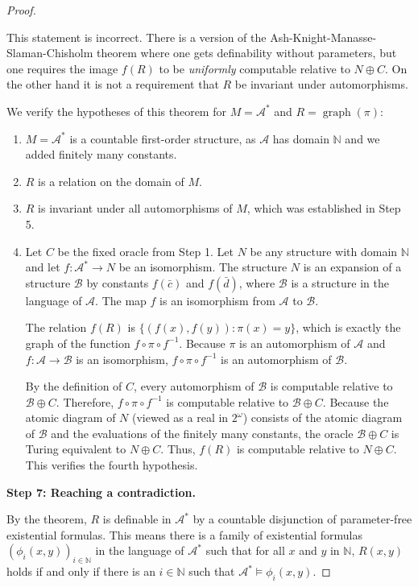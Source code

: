 \documentclass[12pt]{article}
\newcommand{\review}[1]{\begin{reviewbox}#1\end{reviewbox}}
\begin{document}
\begin{proof}
\review{This statement is incorrect. There is a version of the Ash-Knight-Manasse-Slaman-Chisholm theorem where one gets definability without parameters, but one requires the image $f(R)$ to be \textit{uniformly} computable relative to $N \oplus C$. On the other hand it is not a requirement that $R$ be invariant under automorphisms.}

We verify the hypotheses of this theorem for $M = \mathcal{A}^*$ and $R = \operatorname{graph}(\pi)$:
\begin{enumerate}
\item $M = \mathcal{A}^*$ is a countable first-order structure, as $\mathcal{A}$ has domain $\mathbb{N}$ and we added finitely many constants.
\item $R$ is a relation on the domain of $M$.
\item $R$ is invariant under all automorphisms of $M$, which was established in Step 5.
\item Let $C$ be the fixed oracle from Step 1. Let $N$ be any structure with domain $\mathbb{N}$ and let $f: \mathcal{A}^* \to N$ be an isomorphism. The structure $N$ is an expansion of a structure $\mathcal{B}$ by constants $f(\bar{c})$ and $f(\bar{d})$, where $\mathcal{B}$ is a structure in the language of $\mathcal{A}$. The map $f$ is an isomorphism from $\mathcal{A}$ to $\mathcal{B}$. 

The relation $f(R)$ is $\{ (f(x), f(y)) : \pi(x) = y \}$, which is exactly the graph of the function $f \circ \pi \circ f^{-1}$. Because $\pi$ is an automorphism of $\mathcal{A}$ and $f: \mathcal{A} \to \mathcal{B}$ is an isomorphism, $f \circ \pi \circ f^{-1}$ is an automorphism of $\mathcal{B}$. 

By the definition of $C$, every automorphism of $\mathcal{B}$ is computable relative to $\mathcal{B} \oplus C$. Therefore, $f \circ \pi \circ f^{-1}$ is computable relative to $\mathcal{B} \oplus C$. Because the atomic diagram of $N$ (viewed as a real in $2^\omega$) consists of the atomic diagram of $\mathcal{B}$ and the evaluations of the finitely many constants, the oracle $\mathcal{B} \oplus C$ is Turing equivalent to $N \oplus C$. Thus, $f(R)$ is computable relative to $N \oplus C$. This verifies the fourth hypothesis.
\end{enumerate}

\textbf{Step 7: Reaching a contradiction.}

By the theorem, $R$ is definable in $\mathcal{A}^*$ by a countable disjunction of parameter-free existential formulas. This means there is a family of existential formulas $(\phi_i(x,y))_{i \in \mathbb{N}}$ in the language of $\mathcal{A}^*$ such that for all $x$ and $y$ in $\mathbb{N}$, $R(x, y)$ holds if and only if there is an $i \in \mathbb{N}$ such that $\mathcal{A}^* \models \phi_i(x, y)$.


\end{proof}
\end{document}
